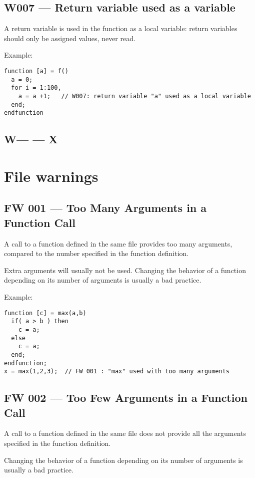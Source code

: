 \documentclass{article}
\begin{document}
\subsection{W007 --- Return variable used as a variable}

A return variable is used in the function as a local variable: return
variables should only be assigned values, never read. 

Example:
\begin{verbatim}
function [a] = f()
  a = 0;
  for i = 1:100,
    a = a +1;   // W007: return variable "a" used as a local variable
  end;
endfunction
\end{verbatim}


\subsection{W--- --- X}


\section{File warnings}

\subsection{FW 001 --- Too Many Arguments in a Function Call}

A call to a function defined in the same file provides too many
arguments, compared to the number specified in the function definition.

Extra arguments will usually not be used. Changing the behavior of a
function depending on its number of arguments is usually a bad
practice.


Example:
\begin{verbatim}
function [c] = max(a,b)
  if( a > b ) then
    c = a;
  else
    c = a;
  end;
endfunction;
x = max(1,2,3);  // FW 001 : "max" used with too many arguments
\end{verbatim}

\subsection{FW 002 --- Too Few Arguments in a Function Call}

A call to a function defined in the same file does not provide all the
arguments specified in the function definition.

Changing the behavior of a function depending on its number of
arguments is usually a bad practice.
\end{document}

